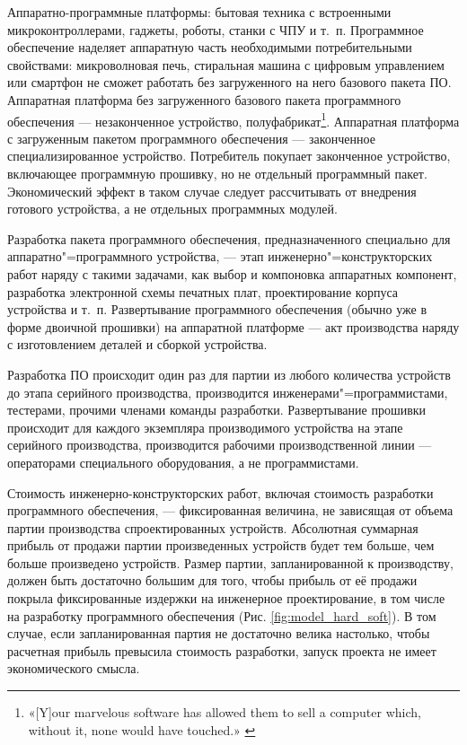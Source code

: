 \documentclass{article}
\begin{document}
Аппаратно-программные платформы: бытовая техника с встроенными микроконтроллерами, гаджеты, роботы, станки с ЧПУ и т.~п. Программное обеспечение наделяет аппаратную часть необходимыми потребительными свойствами: микроволновая печь, стиральная машина с цифровым управлением или смартфон не сможет работать без загруженного на него базового пакета ПО. Аппаратная платформа без загруженного базового пакета программного обеспечения — незаконченное устройство, полуфабрикат\footnote{«[Y]our marvelous software has allowed them to sell a computer which, without it, none would have touched.» \cite{driscollOpenLetter}}. Аппаратная платформа с загруженным пакетом программного обеспечения — законченное специализированное устройство. Потребитель покупает законченное устройство, включающее программную прошивку, но не отдельный программный пакет. Экономический эффект в таком случае следует рассчитывать от внедрения готового устройства, а не отдельных программных модулей.

Разработка пакета программного обеспечения, предназначенного специально для аппаратно"=программного устройства, — этап инженерно"=конструкторских работ наряду с такими задачами, как выбор и компоновка аппаратных компонент, разработка электронной схемы печатных плат, проектирование корпуса устройства и т.~п. Развертывание программного обеспечения (обычно уже в форме двоичной прошивки) на аппаратной платформе — акт производства наряду с изготовлением деталей и сборкой устройства. 

Разработка ПО происходит один раз для партии из любого количества устройств до этапа серийного производства, производится инженерами"=программистами, тестерами, прочими членами команды разработки. Развертывание прошивки происходит для каждого экземпляра производимого устройства на этапе серийного производства, производится рабочими производственной линии — операторами специального оборудования, а не программистами.

Стоимость инженерно-конструкторских работ, включая стоимость разработки программного обеспечения, — фиксированная величина, не зависящая от объема партии производства спроектированных устройств. Абсолютная суммарная прибыль от продажи партии произведенных устройств будет тем больше, чем больше произведено устройств. Размер партии, запланированной к производству, должен быть достаточно большим для того, чтобы прибыль от её продажи покрыла фиксированные издержки на инженерное проектирование, в том числе на разработку программного обеспечения (Рис. \ref{fig:model_hard_soft}). В том случае, если запланированная партия не достаточно велика настолько, чтобы расчетная прибыль превысила стоимость разработки, запуск проекта не имеет экономического смысла.
\end{document}
